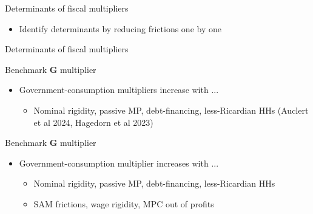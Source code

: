 \documentclass[9pt]{beamer}
\begin{document}
\begin{frame}{Determinants of fiscal multipliers}
\vspace{1cm}
\begin{itemize}
	\item Identify determinants by reducing frictions one by one
\end{itemize}
\end{frame}
%
\begin{frame}{Determinants of fiscal multipliers}

\centering
\begin{small}
\setlength\tabcolsep{1.5pt} 
  
\end{small}
\vspace{-2mm}
\end{frame}
%
\begin{frame}{Benchmark $\boldsymbol{G}$ multiplier}

\centering
\begin{small}
\setlength\tabcolsep{1.5pt} 
  
\end{small}

\begin{itemize}
\item Government-consumption multipliers increase with ...
\begin{itemize}
\item Nominal rigidity, passive MP, debt-financing, less-Ricardian HHs (Auclert
et al 2024, Hagedorn et al 2023) 
\end{itemize}
\end{itemize}
\end{frame}
%
\begin{frame}{Benchmark $\boldsymbol{G}$ multiplier}

\centering
\begin{small}
\setlength\tabcolsep{2.5pt} 
  
\end{small}
\begin{itemize}
\item Government-consumption multiplier increases with ...
\begin{itemize}
\item Nominal rigidity, passive MP, debt-financing, less-Ricardian HHs
\item SAM frictions, wage rigidity, MPC out of profits
\end{itemize}
\end{itemize}
\end{frame}
\end{document}
